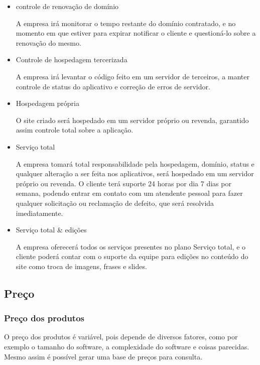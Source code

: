 	\begin{itemize}

		\item{controle de renovação de domínio}

			A empresa irá monitorar o tempo restante do domínio contratado, e no momento em que estiver para expirar notificar o cliente e questioná-lo sobre a renovação do mesmo.

		\item{Controle de hospedagem tercerizada}

			A empresa irá levantar o código feito em um servidor de terceiros, a manter controle de status do aplicativo e correção de erros de servidor.

		\item{Hospedagem própria}

			O site criado será hospedado em um servidor próprio ou revenda, garantido assim controle total sobre a aplicação.

		\item{Serviço total}

			A empresa tomará total responsabilidade pela hospedagem, domínio, status e qualquer alteração a ser feita nos aplicativos, será hospedado em um servidor próprio ou revenda. O cliente terá suporte 24 horas por dia 7 dias por semana, podendo entrar em contato com um atendente pessoal para fazer qualquer solicitação ou reclamação de defeito, que será resolvida imediatamente.

		\item{Serviço total \& edições}

			A empresa oferecerá todos os serviços presentes no plano Serviço total, e o cliente poderá contar com o suporte da equipe para edições no conteúdo do site como troca de imagens, frases e slides.

	\end{itemize}

\subsection{Preço}

	\subsubsection{Preço dos produtos}

		O preço dos produtos é variável, pois depende de diversos fatores, como por exemplo o tamanho do software, a complexidade do software e coisas parecidas. Mesmo assim é possível gerar uma base de preços para consulta.

